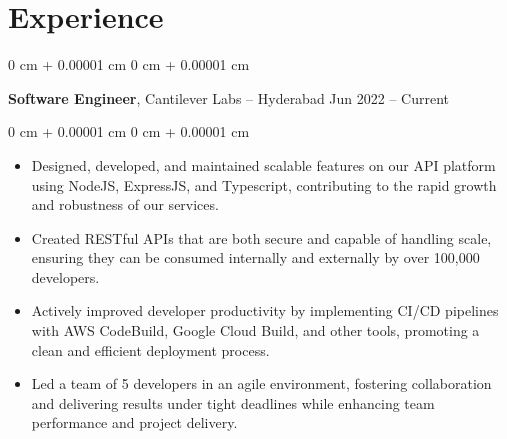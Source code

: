 \documentclass[10pt, letterpaper]{article}
\newenvironment{highlights}{
    \begin{itemize}[
        topsep=0.10 cm,
        parsep=0.10 cm,
        partopsep=0pt,
        itemsep=0pt,
        leftmargin=0 cm + 10pt
    ]
}{
    \end{itemize}
} %
\newenvironment{highlightsforbulletentries}{
    \begin{itemize}[
        topsep=0.10 cm,
        parsep=0.10 cm,
        partopsep=0pt,
        itemsep=0pt,
        leftmargin=10pt
    ]
}{
    \end{itemize}
} %
\newenvironment{onecolentry}{
    \begin{adjustwidth}{
        0 cm + 0.00001 cm
    }{
        0 cm + 0.00001 cm
    }
}{
    \end{adjustwidth}
} %
\newenvironment{twocolentry}[2][]{
    \onecolentry
    \def\secondColumn{#2}
    \setcolumnwidth{\fill, 4.5 cm}
    \begin{paracol}{2}
}{
    \switchcolumn \raggedleft \secondColumn
    \end{paracol}
    \endonecolentry
} %
\begin{document}
    








    \section{Experience}



        
        \begin{twocolentry}{
            Jun 2022 – Current
        }
            \textbf{Software Engineer}, Cantilever Labs -- Hyderabad\end{twocolentry}

        \vspace{0.10 cm}
        \begin{onecolentry}
            \begin{highlights}
    \item Designed, developed, and maintained scalable features on our API platform using NodeJS, ExpressJS, and Typescript, contributing to the rapid growth and robustness of our services.
    \item Created RESTful APIs that are both secure and capable of handling scale, ensuring they can be consumed internally and externally by over 100,000 developers.
    \item Actively improved developer productivity by implementing CI/CD pipelines with AWS CodeBuild, Google Cloud Build, and other tools, promoting a clean and efficient deployment process.
    \item Led a team of 5 developers in an agile environment, fostering collaboration and delivering results under tight deadlines while enhancing team performance and project delivery.
            \end{highlights}
        \end{onecolentry}
\end{document}
